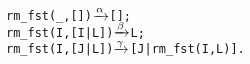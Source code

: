 \begin{alltt}
rm_fst(_,   []) \(\smashedrightarrow{\alpha}\) [];
rm_fst(I,[I|L]) \(\smashedrightarrow{\beta}\) L;
rm_fst(I,[J|L]) \(\smashedrightarrow{\gamma}\) [J|rm_fst(I,L)].
\end{alltt}
